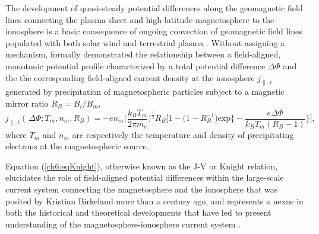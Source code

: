   The development of quasi-steady potential differences along the
  geomagnetic field lines connecting the plasma sheet and
  high-latitude magnetosphere to the ionosphere is a basic consequence
  of ongoing convection of geomagnetic field lines populated with both
  solar wind and terrestrial plasma \citep[e.g., review by][Chapter
  3]{Paschmann2003}. Without assigning a mechanism, \citet{Knight1973}
  formally demonstrated the relationship between a field-aligned,
  monotonic potential profile characterized by a total potential
  difference $\Delta \Phi$ and the the corresponding field-aligned
  current density at the ionosphere $j_{\parallel,i}$ generated by
  precipitation of magnetospheric particles subject to a magnetic
  mirror ratio $R_B = B_{i} / B_{m}$,
    \begin{equation} \label{ch6:eqKnight} j_{\parallel,i} ( \, \Delta \Phi ;
      T_m, n_m, R_B ) = - e n_m \Big ( \dfrac{k_B T_m}{2 \pi m_e} \Big
      )^{\frac{1}{2}} R_B \Bigg [ 1 - \Big ( 1 - R_B^{-1} \Big )
      \textrm{exp} \Big \{ - \dfrac{e \Delta \Phi}{k_B T_m ( R_B - 1 )}
      \Big \} \Bigg],
    \end{equation}
  where $T_m$ and $n_m$ are respectively the temperature and density
  of precipitating electrons at the magnetospheric source.


  Equation (\ref{ch6:eqKnight}), otherwise known as the J-V or Knight
  relation, elucidates the role of field-aligned potential differences
  within the large-scale current system connecting the magnetosphere
  and the ionosphere that was posited by Kristian Birkeland more than
  a century ago, and represents a nexus in both the historical and
  theoretical developments that have led to present understanding of
  the magnetosphere-ionosphere current system
  \citep[e.g.,][]{Temerin1997,Hultqvist1999,Cowley2000,Bostrom2003a,Paschmann2003,Pierrard2007a,Karlsson2012}.

